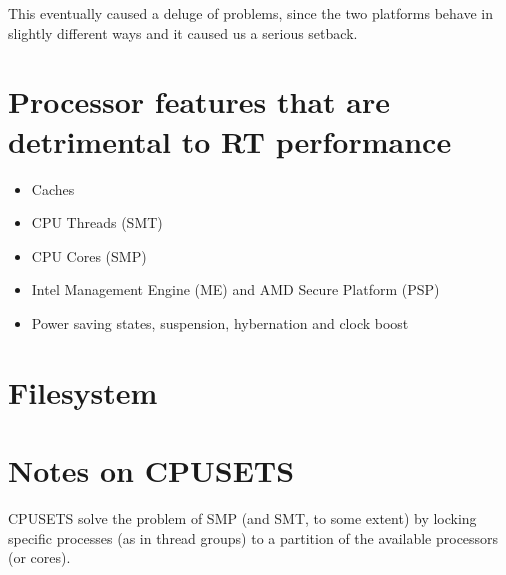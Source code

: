 \documentclass[a4paper,12pt]{report}
\begin{document}
This eventually caused a deluge of problems, since the two platforms behave in slightly different ways and it caused us a serious setback.


\section{Processor features that are detrimental to RT performance}

\begin{itemize}
    \item Caches
    \item CPU Threads (SMT)
    \item CPU Cores (SMP)
    \item Intel Management Engine (ME) and AMD Secure Platform (PSP)
    \item Power saving states, suspension, hybernation and clock boost
\end{itemize}


\section{Filesystem}


\section{Notes on CPUSETS} %

CPUSETS solve the problem of SMP (and SMT, to some extent) by locking specific processes (as in thread groups) to a partition of the available processors (or cores).


\printbibliography
\end{document}

